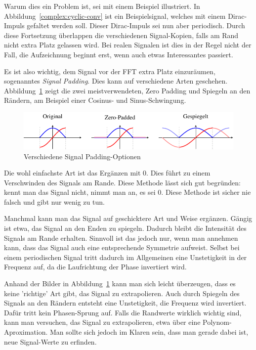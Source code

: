 Warum dies ein Problem ist, sei mit einem Beispiel illustriert.
In Abbildung~\ref{complex:cyclic-conv} ist ein Beispielsignal, welches mit einem Dirac-Impuls gefaltet werden soll.
Dieser Dirac-Impuls sei nun aber periodisch.
Durch diese Fortsetzung überlappen die verschiedenen Signal-Kopien, falls am Rand nicht extra Platz gelassen wird.
Bei realen Signalen ist dies in der Regel nicht der Fall, die Aufzeichnung beginnt erst, wenn auch etwas Interessantes passiert.

Es ist also wichtig, dem Signal vor der FFT extra Platz einzuräumen, sogenanntes \emph{Signal Padding}.
Dies kann auf verschiedene Arten geschehen.
Abbildung~\ref{complex:padding} zeigt die zwei meistverwendeten, Zero Padding und Spiegeln an den Rändern, am Beispiel einer Cosinus- und Sinus-Schwingung.
\begin{figure}
	\centering
	\includegraphics{papers/complex/images/signal_padding.pdf}
	\caption{Verschiedene Signal Padding-Optionen}
	\label{complex:padding}
\end{figure}

Die wohl einfachste Art ist das Ergänzen mit $0$.
Dies führt zu einem Verschwinden des Signals am Rande.
Diese Methode lässt sich gut begründen: kennt man das Signal nicht, nimmt man an, es sei $0$.
Diese Methode ist sicher nie falsch und gibt nur wenig zu tun.

Manchmal kann man das Signal auf geschicktere Art und Weise ergänzen.
Gängig ist etwa, das Signal an den Enden zu spiegeln.
Dadurch bleibt die Intensität des Signals am Rande erhalten.
Sinnvoll ist das jedoch nur, wenn man annehmen kann, dass das Signal auch eine entsprechende Symmetrie aufweist.
Selbst bei einem periodischen Signal tritt dadurch im Allgemeinen eine Unstetigkeit in der Frequenz auf, da die Laufrichtung der Phase invertiert wird.

Anhand der Bilder in Abbildung~\ref{complex:padding} kann man sich leicht überzeugen, dass es keine 'richtige' Art gibt, das Signal zu extrapolieren.
Auch durch Spiegeln des Signals an den Rändern entsteht eine Unstetigkeit, die Frequenz wird invertiert. Dafür tritt kein Phasen-Sprung auf.
Falls die Randwerte wirklich wichtig sind, kann man versuchen, das Signal zu extrapolieren, etwa über eine Polynom-Aproximation.
Man sollte sich jedoch im Klaren sein, dass man gerade dabei ist, neue Signal-Werte zu erfinden.


